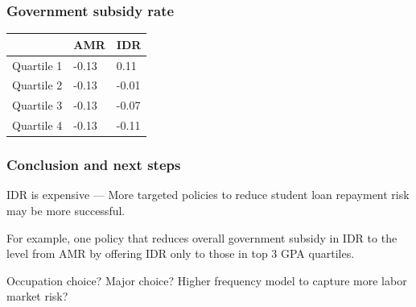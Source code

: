 \documentclass[10pt]{beamer}
\begin{document}
  \begin{frame} \frametitle{Government subsidy rate}

    \begin{table}[H]
      \begin{tabular}{lll}
        \toprule
        & \textbf{AMR} & \textbf{IDR} \\
        \midrule
        Quartile 1 & -0.13 & 0.11 \\
        Quartile 2 & -0.13 & -0.01 \\
        Quartile 3 & -0.13 & -0.07 \\
        Quartile 4 & -0.13 & -0.11 \\
        \bottomrule
      \end{tabular}
    \end{table}

  \end{frame}

  \begin{frame} \frametitle{Conclusion and next steps}

    IDR is expensive --- More targeted policies to reduce student loan repayment risk may be more
    successful.

    For example, one policy that reduces overall government subsidy in IDR to the level from AMR by
    offering IDR only to those in top 3 GPA quartiles.

    \vspace{0.5cm}

    Occupation choice? Major choice? Higher frequency model to capture more labor market risk?

  \end{frame}
\end{document}
